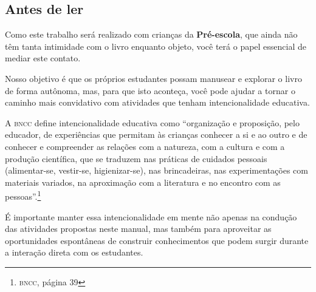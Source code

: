 \documentclass[11pt]{extarticle}
\begin{document}
\subsection{Antes de ler}


Como este trabalho será realizado com crianças da \textbf{Pré-escola}, 
que ainda não têm tanta intimidade com o livro enquanto objeto, você terá o 
papel essencial de mediar este contato. 

Nosso objetivo é que os próprios estudantes possam manusear 
e explorar o livro de forma autônoma, mas, para que isto aconteça, você 
pode ajudar a tornar o caminho mais convidativo com atividades que tenham 
intencionalidade educativa. 

A \textsc{bncc} define intencionalidade educativa como ``organização 
e proposição, pelo educador, de experiências que permitam às crianças 
conhecer a si e ao outro e de conhecer e compreender as relações com a 
natureza, com a cultura e com a produção científica, que se traduzem nas 
práticas de cuidados pessoais (alimentar-se, vestir-se, higienizar-se), 
nas brincadeiras, nas experimentações com materiais 
variados, na aproximação com a literatura e no encontro com as 
pessoas''.\footnote{\textsc{bncc}, página 39}

É importante manter essa intencionalidade em mente não apenas na condução 
das atividades propostas neste manual, mas também para aproveitar as 
oportunidades espontâneas de construir conhecimentos que podem surgir durante 
a interação direta com os estudantes.
\end{document}

